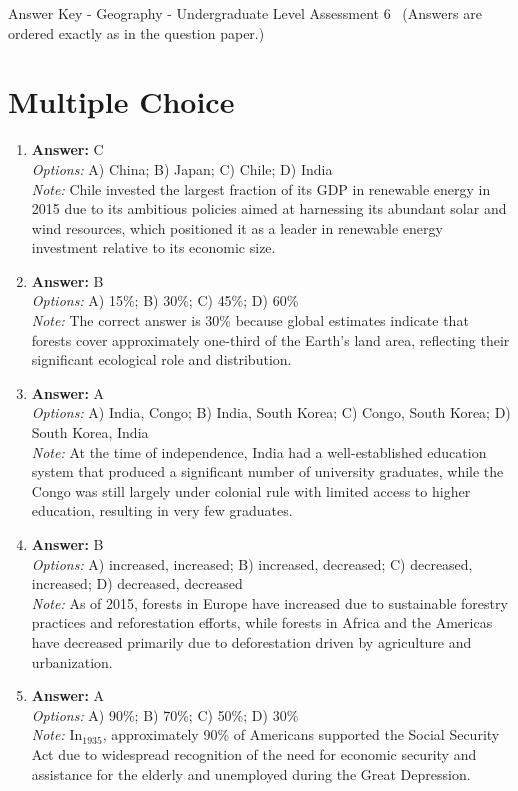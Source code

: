 \documentclass[12pt]{article}
\begin{document}
\begin{center}
Answer Key - Geography - Undergraduate Level Assessment 6 \
\small (Answers are ordered exactly as in the question paper.)
\end{center}

\section*{Multiple Choice}
\begin{enumerate}[label=\arabic*.]
\item \textbf{Answer:} C
\\ \textit{Options:} A) China; B) Japan; C) Chile; D) India
\\ \textit{Note:} Chile invested the largest fraction of its GDP in renewable energy in 2015 due to its ambitious policies aimed at harnessing its abundant solar and wind resources, which positioned it as a leader in renewable energy investment relative to its economic size.
\item \textbf{Answer:} B
\\ \textit{Options:} A) 15\%; B) 30\%; C) 45\%; D) 60\%
\\ \textit{Note:} The correct answer is 30\% because global estimates indicate that forests cover approximately one-third of the Earth's land area, reflecting their significant ecological role and distribution.
\item \textbf{Answer:} A
\\ \textit{Options:} A) India, Congo; B) India, South Korea; C) Congo, South Korea; D) South Korea, India
\\ \textit{Note:} At the time of independence, India had a well-established education system that produced a significant number of university graduates, while the Congo was still largely under colonial rule with limited access to higher education, resulting in very few graduates.
\item \textbf{Answer:} B
\\ \textit{Options:} A) increased, increased; B) increased, decreased; C) decreased, increased; D) decreased, decreased
\\ \textit{Note:} As of 2015, forests in Europe have increased due to sustainable forestry practices and reforestation efforts, while forests in Africa and the Americas have decreased primarily due to deforestation driven by agriculture and urbanization.
\item \textbf{Answer:} A
\\ \textit{Options:} A) 90\%; B) 70\%; C) 50\%; D) 30\%
\\ \textit{Note:} In$_{1935}$, approximately 90\% of Americans supported the Social Security Act due to widespread recognition of the need for economic security and assistance for the elderly and unemployed during the Great Depression.
\end{enumerate}
\end{document}
